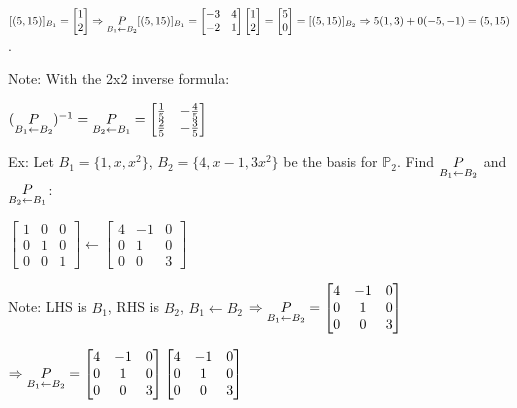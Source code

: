 \documentclass{article}
\begin{document}
$[(5, 15)]_{B_1} = \begin{bmatrix} 1 \\ 2 \end{bmatrix} \Rightarrow \underset{B_1 \leftarrow B_2}{\large P}[(5,15)]_{B_1} = \begin{bmatrix} -3 & 4 \\ -2 & 1 \end{bmatrix} \begin{bmatrix} 1 \\ 2 \end{bmatrix} = \begin{bmatrix} 5 \\ 0 \end{bmatrix} = [(5,15)]_{B_2} \Rightarrow 5(1,3)+0(-5,-1) = (5,15)$.

Note: With the 2x2 inverse formula:

$(\underset{B_1 \leftarrow B_2}{\large P})^{-1} = \underset{B_2 \leftarrow B_1}{\large P} = \begin{bmatrix} \frac{1}{5} & -\frac{4}{5} \\ \frac{2}{5} & -\frac{3}{5} \end{bmatrix}$

Ex: Let $B_1 = \{1, x, x^2\}$, $B_2 = \{4, x-1, 3x^2\}$ be the basis for $\mathbb{P}_2$. Find $\underset{B_1 \leftarrow B_2}{\large P}$ and $\underset{B_2 \leftarrow B_1}{\large P}$:

$\begin{bmatrix} 1 & 0 & 0 \\ 0 & 1 & 0 \\ 0 & 0 & 1 \end{bmatrix} \leftarrow \begin{bmatrix} 4 & -1 & 0 \\ 0 & 1 & 0 \\ 0 & 0 & 3 \end{bmatrix}$

\medskip
Note: LHS is $B_1$, RHS is $B_2$, $B_1 \leftarrow B_2$
\medskip
\newline
$\Rightarrow \underset{B_1 \leftarrow B_2}{\large P} 
= \begin{bmatrix} 4 & -1 & 0 \\ 0 & 1 & 0 \\ 0 & 0 & 3 \end{bmatrix}$


$\Rightarrow \underset{B_1 \leftarrow B_2}{\large P} = \begin{bmatrix} 4 & -1 & 0 \\ 0 & 1 & 0 \\ 0 & 0 & 3 \end{bmatrix} \begin{bmatrix} 4 & -1 & 0 \\ 0 & 1 & 0 \\ 0 & 0 & 3 \end{bmatrix}$
\end{document}
